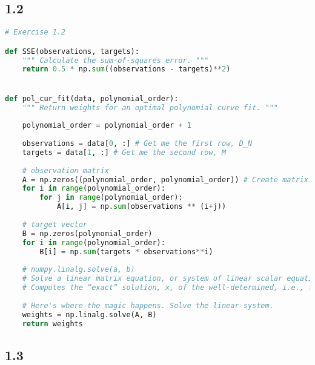\documentclass[a4paper]{article}
\begin{document}
\subsection*{1.2}


\begin{lstlisting}[language=Python]
# Exercise 1.2

def SSE(observations, targets):
    """ Calculate the sum-of-squares error. """
    return 0.5 * np.sum((observations - targets)**2)


def pol_cur_fit(data, polynomial_order):
    """ Return weights for an optimal polynomial curve fit. """
    
    polynomial_order = polynomial_order + 1
    
    observations = data[0, :] # Get me the first row, D_N
    targets = data[1, :] # Get me the second row, M
    
    # observation matrix
    A = np.zeros((polynomial_order, polynomial_order)) # Create matrix
    for i in range(polynomial_order):
        for j in range(polynomial_order):
            A[i, j] = np.sum(observations ** (i+j))
    
    # target vector        
    B = np.zeros(polynomial_order)
    for i in range(polynomial_order):
        B[i] = np.sum(targets * observations**i)
    
    # numpy.linalg.solve(a, b)
    # Solve a linear matrix equation, or system of linear scalar equations.
    # Computes the “exact” solution, x, of the well-determined, i.e., full rank, linear matrix equation ax = b.
    
    # Here's where the magic happens. Solve the linear system.
    weights = np.linalg.solve(A, B)
    return weights

\end{lstlisting}


\subsection*{1.3}
\end{document}
